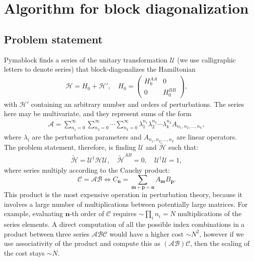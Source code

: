 \section{Algorithm for block diagonalization}

\subsection{Problem statement}

Pymablock finds a series of the unitary transformation $\mathcal{U}$ (we use
calligraphic letters to denote series) that block-diagonalizes the Hamiltonian
%
\begin{align}
\label{hamiltonian}
\mathcal{H} = H_0 + \mathcal{H}',\quad H_0 = \begin{pmatrix}
H_0^{AA} & 0\\
0 & H_0^{BB}
\end{pmatrix},
\end{align}
%
with $\mathcal{H}'$ containing an arbitrary number and orders of perturbations.
The series here may be multivariate, and they represent sums of the form
%
\begin{align}
\mathcal{A} = \sum_{n_1=0}^\infty \sum_{n_2=0}^\infty \cdots \sum_{n_k=0}^\infty \lambda_1^{n_1} \lambda_2^{n_2} \cdots \lambda_k^{n_k} A_{n_1, n_2, \ldots, n_k},
\end{align}
%
where $\lambda_i$ are the perturbation parameters and $A_{n_1, n_2, \ldots,
n_k}$ are linear operators.
%
The problem statement, therefore, is finding $\mathcal{U}$ and
$\tilde{\mathcal{H}}$ such that:
%
\begin{align}
\label{eq:problem_definition}
\tilde{\mathcal{H}} = \mathcal{U}^\dagger \mathcal{H} \mathcal{U},\quad \tilde{\mathcal{H}}^{AB} = 0,\quad \mathcal{U}^\dagger \mathcal{U} = 1,
\end{align}
%
where series multiply according to the Cauchy product:
%
$$
\mathcal{C} = \mathcal{A}\mathcal{B} \Leftrightarrow C_\mathbf{n} = \sum_{\mathbf{m} + \mathbf{p} = \mathbf{n}} A_\mathbf{m} B_\mathbf{p}.
$$
%
This product is the most expensive operation in perturbation theory, because it
involves a large number of multiplications between potentially large matrices.
For example, evaluating $\mathbf{n}$-th order of $\mathcal{C}$ requires
$\sim\prod_i n_i = N$ multiplications of the series elements.
A direct computation of all the possible index combinations in a product
between three series $\mathcal{A}\mathcal{B}\mathcal{C}$ would have a higher
cost $\sim N^2$, however if we use associativity of the product and compute
this as $(\mathcal{A}\mathcal{B})\mathcal{C}$, then the scaling of the cost
stays $\sim N$.

